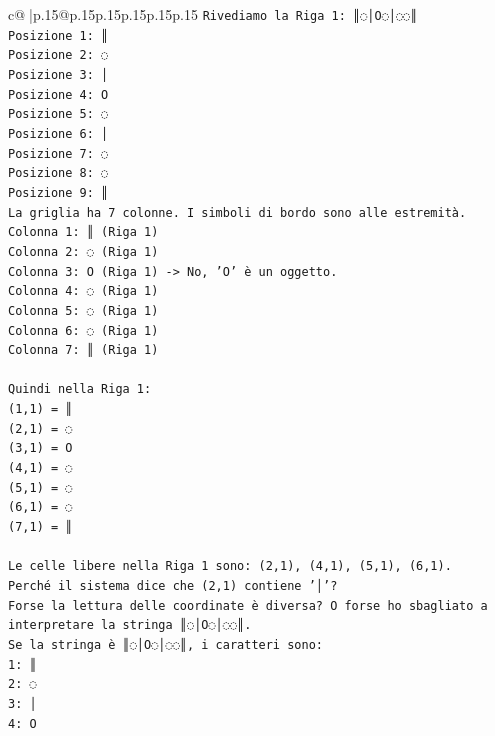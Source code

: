 \documentclass{article}
\begin{document}
{\begin{supertabular}{c@{$\;$}|p{.15\linewidth}@{}p{.15\linewidth}p{.15\linewidth}p{.15\linewidth}p{.15\linewidth}p{.15\linewidth}}
{{{\texttt{Rivediamo la Riga 1: ║◌│O◌│◌◌║} \\
\texttt{Posizione 1: ║} \\
\texttt{Posizione 2: ◌} \\
\texttt{Posizione 3: │} \\
\texttt{Posizione 4: O} \\
\texttt{Posizione 5: ◌} \\
\texttt{Posizione 6: │} \\
\texttt{Posizione 7: ◌} \\
\texttt{Posizione 8: ◌} \\
\texttt{Posizione 9: ║} \\
\texttt{La griglia ha 7 colonne. I simboli di bordo sono alle estremità.} \\
\texttt{Colonna 1: ║ (Riga 1)} \\
\texttt{Colonna 2: ◌ (Riga 1)} \\
\texttt{Colonna 3: O (Riga 1) {-}> No, 'O' è un oggetto.} \\
\texttt{Colonna 4: ◌ (Riga 1)} \\
\texttt{Colonna 5: ◌ (Riga 1)} \\
\texttt{Colonna 6: ◌ (Riga 1)} \\
\texttt{Colonna 7: ║ (Riga 1)} \\
\\ 
\texttt{Quindi nella Riga 1:} \\
\texttt{(1,1) = ║} \\
\texttt{(2,1) = ◌} \\
\texttt{(3,1) = O} \\
\texttt{(4,1) = ◌} \\
\texttt{(5,1) = ◌} \\
\texttt{(6,1) = ◌} \\
\texttt{(7,1) = ║} \\
\\ 
\texttt{Le celle libere nella Riga 1 sono: (2,1), (4,1), (5,1), (6,1).} \\
\texttt{Perché il sistema dice che (2,1) contiene '│'?} \\
\texttt{Forse la lettura delle coordinate è diversa? O forse ho sbagliato a interpretare la stringa ║◌│O◌│◌◌║.} \\
\texttt{Se la stringa è ║◌│O◌│◌◌║, i caratteri sono:} \\
\texttt{1: ║} \\
\texttt{2: ◌} \\
\texttt{3: │} \\
\texttt{4: O} \\
}}}
\end{supertabular}}
\end{document}
